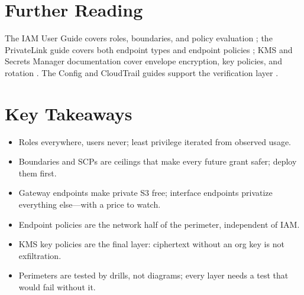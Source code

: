 \section{Further Reading}
The IAM User Guide covers roles, boundaries, and policy evaluation \cite{awsIAMDocs}; the PrivateLink guide covers both endpoint types and endpoint policies \cite{awsPrivateLinkDocs}; KMS and Secrets Manager documentation cover envelope encryption, key policies, and rotation \cite{awsKMSDocs,awsSecretsManagerDocs}. The Config and CloudTrail guides support the verification layer \cite{awsConfigDocs,awsCloudTrailDocs}.

\section*{Key Takeaways}
\begin{itemize}
    \item Roles everywhere, users never; least privilege iterated from observed usage.
    \item Boundaries and SCPs are ceilings that make every future grant safer; deploy them first.
    \item Gateway endpoints make private S3 free; interface endpoints privatize everything else---with a price to watch.
    \item Endpoint policies are the network half of the perimeter, independent of IAM.
    \item KMS key policies are the final layer: ciphertext without an org key is not exfiltration.
    \item Perimeters are tested by drills, not diagrams; every layer needs a test that would fail without it.
\end{itemize}

